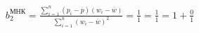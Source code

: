 \documentclass[a4paper,12pt]{article}
\begin{document}
\begin{multline}
  b_2^\text{МНК} = \frac{\sum\limits_{i=1}^{n}(p_i-\overline{p})(w_i-\overline{w})}{\sum\limits_{i=1}^{n}(w_i-\overline{w})^2} = \frac{1}{1} = \frac{1}{1} = 1 + \frac{0}{1} \\
\end{multline}
\end{document}
